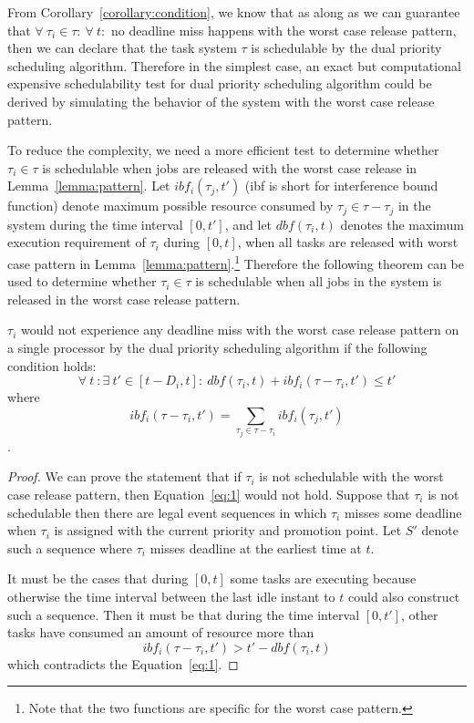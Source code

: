 {From Corollary~\ref{corollary:condition}, we know  that as along as we can guarantee that $\forall~\tau_i\in \tau:~\forall~t:$ no deadline miss happens with the worst case release pattern,  then we can declare that the task system $\tau$ is schedulable by the dual priority scheduling algorithm. Therefore  in the simplest case,  an exact but computational expensive schedulability test for dual priority scheduling algorithm could be derived by simulating the behavior of the system with the worst case release pattern. 


To reduce the complexity, we need a more efficient test to determine whether $\tau_i\in\tau$ is schedulable when jobs are released with the worst case release in Lemma~\ref{lemma:pattern}. Let $ibf_i(\tau_j,t')$ (ibf is short for interference bound function) denote maximum possible resource consumed by $\tau_j\in\tau-\tau_j$ in the system  during the time interval $[0,t']$, and let $dbf(\tau_i,t)$ denotes the maximum execution requirement of $\tau_i$ during $[0,t]$,  when all tasks are released with worst case pattern in Lemma~\ref{lemma:pattern}.\footnote{Note that the two functions are specific for the worst case pattern.}  Therefore the following theorem can be used to determine whether $\tau_i\in \tau$ is schedulable when all jobs in the system is released in the worst case release pattern.
}
\begin{theorem}
\label{theorem:1}
$\tau_i$ would not experience any deadline miss with the worst case release pattern on a single processor by the dual priority scheduling algorithm if the following condition holds:
\begin{equation}
\label{eq:1}
\forall~t~:\exists~t'\in[t-D_i, t]:~dbf(\tau_i,t)+ibf_i(\tau-\tau_i,t')\leq t'
\end{equation} 
where \[ibf_i(\tau-\tau_i,t')=\sum_{\tau_j\in \tau-\tau_i}ibf_i(\tau_j,t')\].
\end{theorem}
\begin{proof}
We can prove the statement that if $\tau_i$ is not schedulable with the worst case release pattern, then Equation~\ref{eq:1} would not hold. Suppose that $\tau_i$ is not schedulable then there are legal event sequences in which $\tau_i$ misses some deadline when $\tau_i$ is assigned with the current priority and promotion point. Let $S'$ denote such a sequence where $\tau_i$ misses deadline at the earliest time at $t$.

It must be the cases that during $[0,t]$ some tasks are executing because otherwise the time interval between the last idle instant to $t$ could also construct such a sequence. Then it must be that during the time interval $[0,t']$, other tasks have consumed an amount of resource more than 
\[
ibf_i(\tau-\tau_i,t')>t'-dbf(\tau_i,t)
\]
which contradicts the Equation~\ref{eq:1}.
\end{proof}
